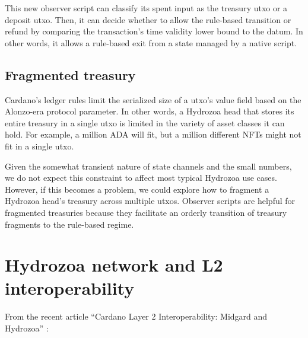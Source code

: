 \documentclass[../hydrozoa.tex]{subfiles}
\begin{document}
This new observer script can classify its spent input as the treasury utxo or a deposit utxo. Then, it can decide whether to allow the rule-based transition or refund by comparing the transaction's time validity lower bound to the datum.
In other words, it allows a rule-based exit from a state managed by a native script.

\subsection{Fragmented treasury}%
\label{h:observer-script-fragmented-treasury}%

Cardano's ledger rules limit the serialized size of a utxo's value field based on the Alonzo-era  protocol parameter.
In other words, a Hydrozoa head that stores its entire treasury in a single utxo is limited in the variety of asset classes it can hold. For example, a million ADA will fit, but a million different NFTs might not fit in a single utxo.

Given the somewhat transient nature of state channels and the small numbers, we do not expect this constraint to affect most typical Hydrozoa use cases.
However, if this becomes a problem, we could explore how to fragment a Hydrozoa head's treasury across multiple utxos.
Observer scripts are helpful for fragmented treasuries because they facilitate an orderly transition of treasury fragments to the rule-based regime.

\section{Hydrozoa network and L2 interoperability}%
\label{h:hydrozoa-network-l2-interoperability}%

From the recent article ``Cardano Layer 2 Interoperability:
Midgard and Hydrozoa'' \citep{FlerovskyDisarroCardanoLayer22024}:
\end{document}
